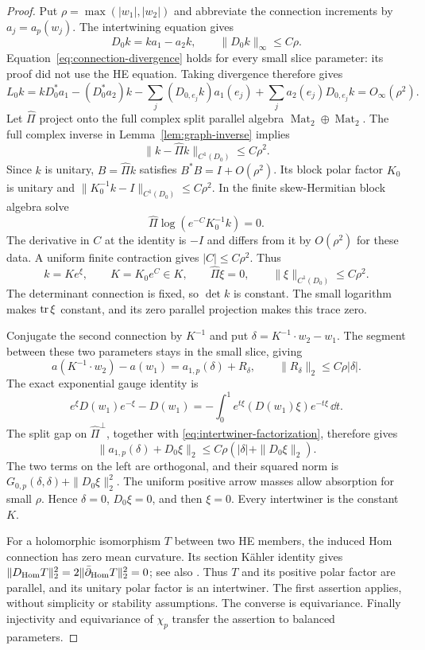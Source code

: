 \begin{proof}
Put $\rho=\max(|w_1|,|w_2|)$ and abbreviate the connection
increments by $a_j=a_p(w_j)$. The intertwining equation gives
\[
 D_0k=ka_1-a_2k,\qquad \|D_0k\|_\infty\le C\rho.
\]
Equation~\eqref{eq:connection-divergence} holds for every
small slice parameter: its proof did not use the HE equation.
Taking divergence therefore gives
\[
 L_0k=kD_0^*a_1-(D_0^*a_2)k
       -\sum_j(D_{0,e_j}k)a_1(e_j)
       +\sum_ja_2(e_j)D_{0,e_j}k=O_\infty(\rho^2).
\]
Let $\widehat\Pi$ project onto the full complex split
parallel algebra $\operatorname{Mat}_2\oplus\operatorname{Mat}_2$.
The full complex inverse in Lemma~\ref{lem:graph-inverse}
implies
\begin{equation}\label{eq:intertwiner-complement}
                    \|k-\widehat\Pi k\|_{C^1(D_0)}\le C\rho^2.
\end{equation}
Since $k$ is unitary, $B=\widehat\Pi k$ satisfies
$B^*B=I+O(\rho^2)$. Its block polar factor $K_0$
is unitary and $\|K_0^{-1}k-I\|_{C^1(D_0)}\le C\rho^2$.
In the finite skew-Hermitian block algebra solve
\[
                 \widehat\Pi\log(e^{-C}K_0^{-1}k)=0.
\]
The derivative in $C$ at the identity is $-I$ and differs
from it by $O(\rho^2)$ for these data. A uniform finite
contraction gives $|C|\le C\rho^2$. Thus
\begin{equation}\label{eq:intertwiner-factorization}
 k=Ke^\xi,\qquad K=K_0e^C\in K,\qquad
 \widehat\Pi\xi=0,\qquad \|\xi\|_{C^1(D_0)}\le C\rho^2.
\end{equation}
The determinant connection is fixed, so $\det k$ is
constant. The small logarithm makes $\operatorname{tr}\xi$ constant,
and its zero parallel projection makes this trace zero.

Conjugate the second connection by $K^{-1}$ and put
$\delta=K^{-1}\cdot w_2-w_1$. The segment between these
two parameters stays in the small slice, giving
\[
 a(K^{-1}\cdot w_2)-a(w_1)=a_{1,p}(\delta)+R_\delta,
                         \qquad \|R_\delta\|_2\le C\rho|\delta|.
\]
The exact exponential gauge identity is
\[
 e^\xi D(w_1)e^{-\xi}-D(w_1)
                 =-\int_0^1e^{t\xi}(D(w_1)\xi)e^{-t\xi}\,\dd t.
\]
The split gap on $\widehat\Pi^\perp$, together with
\eqref{eq:intertwiner-factorization}, therefore gives
\[
 \|a_{1,p}(\delta)+D_0\xi\|_2
                         \le C\rho(|\delta|+\|D_0\xi\|_2).
\]
The two terms on the left are orthogonal, and their
squared norm is
$G_{0,p}(\delta,\delta)+\|D_0\xi\|_2^2$.
The uniform positive arrow masses allow absorption for
small $\rho$. Hence $\delta=0$, $D_0\xi=0$, and then
$\xi=0$. Every intertwiner is the constant $K$.

For a holomorphic isomorphism $T$ between two HE members,
the induced Hom connection has zero mean curvature.
Its section Kähler identity gives
$\|D_{\rm Hom}T\|_2^2=2\|\bar\partial_{\rm Hom}T\|_2^2=0$;
see also \cite[Theorem 3.1.9(i)]{Kobayashi}.
Thus $T$ and its positive polar factor are parallel,
and its unitary polar factor is an intertwiner.
The first assertion applies, without simplicity or
stability assumptions. The converse is equivariance.
Finally injectivity and equivariance of $\chi_p$ transfer
the assertion to balanced parameters.
\end{proof}

